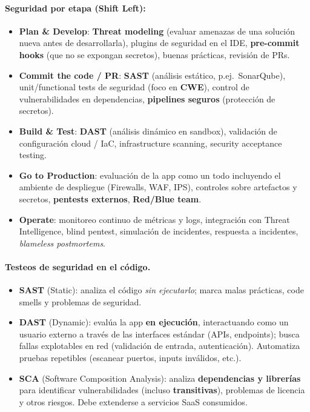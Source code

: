 \documentclass[../main.tex]{subfiles}
\begin{document}

\paragraph{Seguridad por etapa (Shift Left):}
\begin{itemize}
  \item \textbf{Plan \& Develop}: \textbf{Threat modeling} (evaluar amenazas de
    una solución nueva antes de desarrollarla), plugins de seguridad en el IDE,
    \textbf{pre-commit hooks} (que no se expongan secretos), buenas prácticas,
    revisión de PRs.
  \item \textbf{Commit the code / PR}: \textbf{SAST} (análisis estático, p.ej.\
    SonarQube), unit/functional tests de seguridad (foco en \textbf{CWE}),
    control de vulnerabilidades en dependencias, \textbf{pipelines seguros}
    (protección de secretos).
  \item \textbf{Build \& Test}: \textbf{DAST} (análisis dinámico en sandbox),
    validación de configuración cloud / IaC, infrastructure scanning, security
    acceptance testing.
  \item \textbf{Go to Production}: evaluación de la app como un todo incluyendo
    el ambiente de despliegue (Firewalls, WAF, IPS), controles sobre artefactos
    y secretos, \textbf{pentests externos}, \textbf{Red/Blue team}.
  \item \textbf{Operate}: monitoreo continuo de métricas y logs, integración con
    Threat Intelligence, blind pentest, simulación de incidentes, respuesta a
    incidentes, \emph{blameless postmortems}.
\end{itemize}

\paragraph{Testeos de seguridad en el código.}
\begin{itemize}
  \item \textbf{SAST} (Static): analiza el código \emph{sin ejecutarlo}; marca
    malas prácticas, code smells y problemas de seguridad.
  \item \textbf{DAST} (Dynamic): evalúa la app \textbf{en ejecución},
    interactuando como un usuario externo a través de las interfaces estándar
    (APIs, endpoints); busca fallas explotables en red (validación de entrada,
    autenticación). Automatiza pruebas repetibles (escanear puertos, inputs
    inválidos, etc.).
  \item \textbf{SCA} (Software Composition Analysis): analiza
    \textbf{dependencias y librerías} para identificar vulnerabilidades
    (incluso \textbf{transitivas}), problemas de licencia y otros riesgos. Debe
    extenderse a servicios SaaS consumidos.
\end{itemize}
\end{document}
